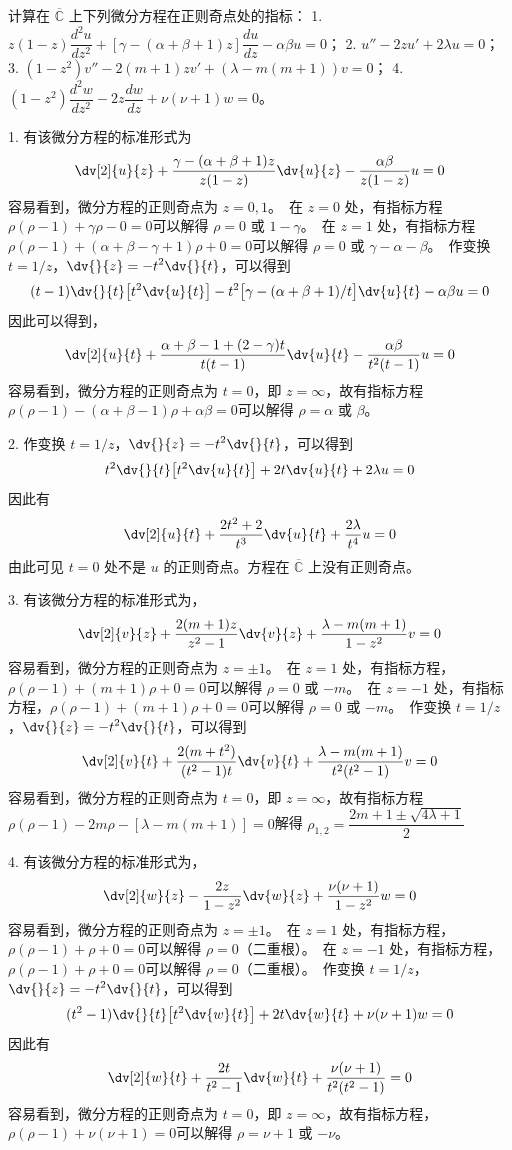 \begin{question}
计算在 \(\overline{\mathbb{C}}\) 上下列微分方程在正则奇点处的指标：
1. \(z(1-z)\dfrac{d^2u}{dz^2}+[\gamma-(\alpha+\beta+1)z]\dfrac{du}{dz}-\alpha\beta u=0\)；
2. \(u''-2z u'+2\lambda u=0\)；
3. \((1-z^2)v''-2(m+1)z v'+(\lambda-m(m+1))v=0\)；
4. \((1-z^2)\dfrac{d^2w}{dz^2}-2z\dfrac{dw}{dz}+\nu(\nu+1)w=0\)。
\begin{solution}
1. 有该微分方程的标准形式为 \[ \dv[2]{u}{z}+\frac{\gamma-(\alpha+\beta+1)z}{z(1-z)}\dv{u}{z}-\frac{\alpha\beta}{z(1-z)}u=0 \]容易看到，微分方程的正则奇点为 \(z=0,1\)。\ 在 \(z=0\) 处，有指标方程 \(\rho(\rho-1)+\gamma\rho-0=0\)可以解得 \(\rho=0\) 或 \(1-\gamma\)。\ 在 \(z=1\) 处，有指标方程 \(\rho(\rho-1)+(\alpha+\beta-\gamma+1)\rho+0=0\)可以解得 \(\rho=0\) 或 \(\gamma-\alpha-\beta\)。\ 作变换 \(t=1/z\)，\(\displaystyle\dv{}{z}=-t^2\dv{}{t}\)，可以得到 \[ (t-1)\dv{}{t}\bigl[t^2\dv{u}{t}\bigr]-t^2\bigl[\gamma-(\alpha+\beta+1)/t\bigr]\dv{u}{t}-\alpha\beta u=0 \]因此可以得到，\[ \dv[2]{u}{t}+\frac{\alpha+\beta-1+(2-\gamma)t}{t(t-1)}\dv{u}{t}-\frac{\alpha\beta}{t^2(t-1)}u=0 \]容易看到，微分方程的正则奇点为 \(t=0\)，即 \(z=\infty\)，故有指标方程 \(\rho(\rho-1)-(\alpha+\beta-1)\rho+\alpha\beta=0\)可以解得 \(\rho=\alpha\) 或 \(\beta\)。

2. 作变换 \(t=1/z\)，\(\displaystyle\dv{}{z}=-t^2\dv{}{t}\)，可以得到 \[ t^2\dv{}{t}\bigl[t^2\dv{u}{t}\bigr]+2t\dv{u}{t}+2\lambda u=0 \]因此有 \[ \dv[2]{u}{t}+\frac{2t^2+2}{t^3}\dv{u}{t}+\frac{2\lambda}{t^4}u=0 \]由此可见 \(t=0\) 处不是 \(u\) 的正则奇点。方程在 \(\overline{\mathbb{C}}\) 上没有正则奇点。

3. 有该微分方程的标准形式为，\[ \dv[2]{v}{z}+\frac{2(m+1)z}{z^2-1}\dv{v}{z}+\frac{\lambda-m(m+1)}{1-z^2}v=0 \]容易看到，微分方程的正则奇点为 \(z=\pm1\)。\ 在 \(z=1\) 处，有指标方程，\(\rho(\rho-1)+(m+1)\rho+0=0\)可以解得 \(\rho=0\) 或 \(-m\)。\ 在 \(z=-1\) 处，有指标方程，\(\rho(\rho-1)+(m+1)\rho+0=0\)可以解得 \(\rho=0\) 或 \(-m\)。\ 作变换 \(t=1/z\)，\(\displaystyle\dv{}{z}=-t^2\dv{}{t}\)，可以得到 \[ \dv[2]{v}{t}+\frac{2(m+t^2)}{(t^2-1)t}\dv{v}{t}+\frac{\lambda-m(m+1)}{t^2(t^2-1)}v=0 \]容易看到，微分方程的正则奇点为 \(t=0\)，即 \(z=\infty\)，故有指标方程 \(\rho(\rho-1)-2m\rho-[\lambda-m(m+1)]=0\)解得 \(\rho_{1,2}=\dfrac{2m+1\pm\sqrt{4\lambda+1}}{2}\)

4. 有该微分方程的标准形式为，\[ \dv[2]{w}{z}-\frac{2z}{1-z^2}\dv{w}{z}+\frac{\nu(\nu+1)}{1-z^2}w=0 \]容易看到，微分方程的正则奇点为 \(z=\pm1\)。\ 在 \(z=1\) 处，有指标方程，\(\rho(\rho-1)+\rho+0=0\)可以解得 \(\rho=0\)（二重根）。\ 在 \(z=-1\) 处，有指标方程，\(\rho(\rho-1)+\rho+0=0\)可以解得 \(\rho=0\)（二重根）。\ 作变换 \(t=1/z\)，\(\displaystyle\dv{}{z}=-t^2\dv{}{t}\)，可以得到 \[ (t^2-1)\dv{}{t}\bigl[t^2\dv{w}{t}\bigr]+2t\dv{w}{t}+\nu(\nu+1)w=0 \]因此有 \[ \dv[2]{w}{t}+\frac{2t}{t^2-1}\dv{w}{t}+\frac{\nu(\nu+1)}{t^2(t^2-1)}=0 \]容易看到，微分方程的正则奇点为 \(t=0\)，即 \(z=\infty\)，故有指标方程，\(\rho(\rho-1)+\nu(\nu+1)=0\)可以解得 \(\rho=\nu+1\) 或 \(-\nu\)。
\end{solution}
\end{question}

